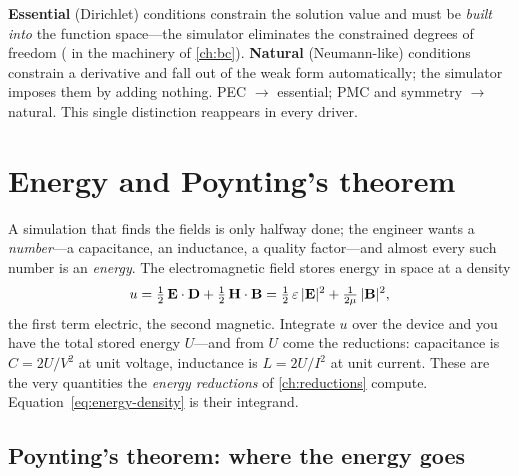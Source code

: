 \begin{notationbox}
\textbf{Essential} (Dirichlet) conditions constrain the solution value and must
be \emph{built into} the function space---the simulator eliminates the
constrained degrees of freedom ( in the
machinery of \cref{ch:bc}). \textbf{Natural} (Neumann-like) conditions
constrain a derivative and fall out of the weak form automatically; the
simulator imposes them by adding nothing. PEC $\to$ essential; PMC and
symmetry $\to$ natural. This single distinction reappears in every driver.
\end{notationbox}

\section{Energy and Poynting's theorem}
\label{sec:energy}

A simulation that finds the fields is only halfway done; the engineer wants a
\emph{number}---a capacitance, an inductance, a quality factor---and almost
every such number is an \emph{energy}. The electromagnetic field stores energy
in space at a density
\begin{equation}
  u = \tfrac12\,\mathbf{E}\cdot\mathbf{D} + \tfrac12\,\mathbf{H}\cdot\mathbf{B}
    = \tfrac12\,\varepsilon\,\lvert\mathbf{E}\rvert^2 + \tfrac{1}{2\mu}\,\lvert\mathbf{B}\rvert^2,
  \label{eq:energy-density}
\end{equation}
the first term electric, the second magnetic. Integrate $u$ over the device and
you have the total stored energy $U$---and from $U$ come the reductions:
capacitance is $C = 2U/V^2$ at unit voltage, inductance is $L = 2U/I^2$ at unit
current. These are the very quantities the \emph{energy reductions} of
\cref{ch:reductions} compute. Equation~\eqref{eq:energy-density} is their
integrand.

\subsection{Poynting's theorem: where the energy goes}

